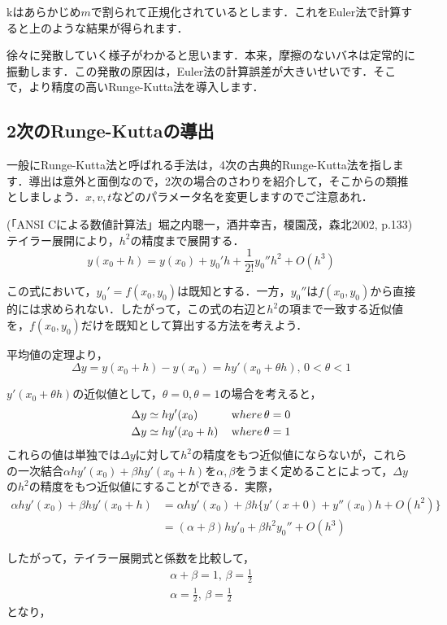 \documentclass[11pt,dvipdfmx]{jsarticle}
\begin{document}
    kはあらかじめ\(m\)で割られて正規化されているとします．これをEuler法で計算すると上のような結果が得られます．

徐々に発散していく様子がわかると思います．本来，摩擦のないバネは定常的に振動します．この発散の原因は，Euler法の計算誤差が大きいせいです．そこで，より精度の高いRunge-Kutta法を導入します．

    \subsection{2次のRunge-Kuttaの導出}\label{ux6b21ux306erunge-kuttaux306eux5c0eux51fa}

一般にRunge-Kutta法と呼ばれる手法は，4次の古典的Runge-Kutta法を指します．導出は意外と面倒なので，2次の場合のさわりを紹介して，そこからの類推としましょう．\(x,v,t\)などのパラメータ名を変更しますのでご注意あれ．

(「ANSI Cによる数値計算法」堀之内聰一，酒井幸吉，榎園茂，森北2002,
p.133) テイラー展開により，\(h^2\)の精度まで展開する． \[
y(x_0+h) = y(x_0) +y_0'h+\frac{1}{2!}y_0''h^2 + O(h^3)
\]

この式において，\(y_0' = f(x_0,y_0)\)は既知とする．一方，\(y_0''\)は\(f(x_0,y_0)\)から直接的には求められない．したがって，この式の右辺と\(h^2\)の項まで一致する近似値を，\(f(x_0,y_0)\)だけを既知として算出する方法を考えよう．

平均値の定理より， \[
\Delta y = y(x_0+h)-y(x_0) = hy'(x_0 + \theta h), \, 0<\theta<1
\]

\(y'(x_0 +\theta h)\)の近似値として，\(\theta=0, \theta=1\)の場合を考えると，
\[
\begin{aligned}
\Delta y &\simeq hy'(x_0) \, &{\textrm where}\, &\theta=0\\
\Delta y &\simeq hy'(x_0+h)  \, &{\textrm where}\, &\theta=1
\end{aligned}
\]
これらの値は単独では\(\Delta y\)に対して\(h^2\)の精度をもつ近似値にならないが，これらの一次結合\(\alpha h y'(x_0)+\beta hy'(x_0+h)\)を\(\alpha, \beta\)をうまく定めることによって，\(\Delta y\)の\(h^2\)の精度をもつ近似値にすることができる．実際，
\[
\begin{aligned}
\alpha h y'(x_0)+\beta hy'(x_0+h) & =\alpha h y'(x_0)+\beta h \{y'(x+0)+y''(x_0)h+O(h^2)\} \\
& =(\alpha+\beta)hy'_0 + \beta h^2 y_0'' + O(h^3)
\end{aligned}
\]

したがって，テイラー展開式と係数を比較して， \[
\begin{aligned}
\alpha + \beta = 1, \, \beta = \frac{1}{2}\\
\alpha = \frac{1}{2}, \, \beta =\frac{1}{2}
\end{aligned}\] となり，
\end{document}
